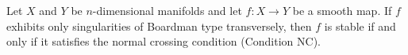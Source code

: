 Let $X$ and $Y$ be $n$-dimensional manifolds and let $f: X \to Y$ be a smooth map. If $f$ exhibits only singularities of Boardman type transversely, then $f$ is stable if and only if it satisfies the normal crossing condition (Condition NC).
